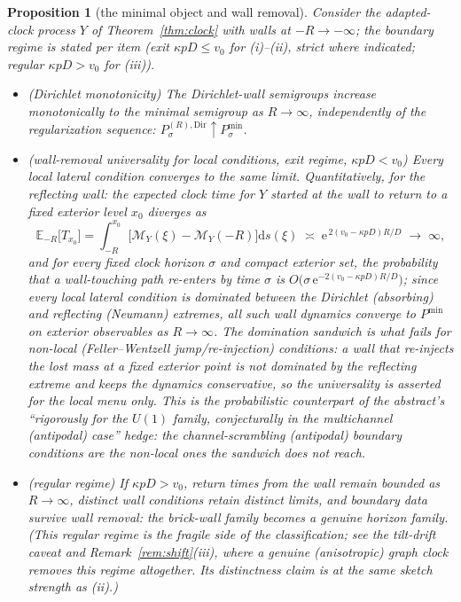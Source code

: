 \documentclass[11pt]{article}
\newtheorem{proposition}[theorem]{Proposition}
\theoremstyle{definition}
\theoremstyle{remark}
\newcommand{\ee}{\mathrm{e}}
\newcommand{\dd}{\mathrm{d}}
\begin{document}
\begin{proposition}[the minimal object and wall removal]
\label{prop:wall}
Consider the adapted-clock process $Y$ of Theorem~\ref{thm:clock} with
walls at $-R\to-\infty$; the boundary regime is stated per item (exit
$\kappa pD\le v_{0}$ for (i)--(ii), strict where indicated; regular
$\kappa pD>v_{0}$ for (iii)).
\begin{itemize}
\item[(i)] \textup{(Dirichlet monotonicity)} The Dirichlet-wall
semigroups increase monotonically to the minimal semigroup as
$R\to\infty$, independently of the regularization sequence:
$P^{(R),\mathrm{Dir}}_{\sigma}\uparrow P^{\min}_{\sigma}$.
\item[(ii)] \textup{(wall-removal universality for local conditions,
exit regime, $\kappa pD<v_{0}$)} Every \emph{local} lateral condition
converges to the same limit.
Quantitatively, for the reflecting wall: the expected clock time for
$Y$ started at the wall to return to a fixed exterior level $x_{0}$
diverges as
\begin{equation}
\mathbb{E}_{-R}\bigl[T_{x_{0}}\bigr]
=\int_{-R}^{x_{0}}\bigl[\mathcal{M}_{Y}(\xi)-\mathcal{M}_{Y}(-R)\bigr]\dd s(\xi)
\;\asymp\;\ee^{\,2(v_{0}-\kappa pD)R/D}
\;\longrightarrow\;\infty ,
\end{equation}
and for every fixed clock horizon $\sigma$ and compact exterior set,
the probability that a wall-touching path re-enters by time $\sigma$
is $O\!\bigl(\sigma\,\ee^{-2(v_{0}-\kappa pD)R/D}\bigr)$; since every
\emph{local} lateral condition is dominated between the
Dirichlet (absorbing) and reflecting (Neumann) extremes, all such
wall dynamics converge to $P^{\min}$ on exterior
observables as $R\to\infty$. The domination sandwich is what fails for
non-local (Feller--Wentzell jump/re-injection) conditions: a wall that
re-injects the lost mass at a fixed exterior point is not dominated by
the reflecting extreme and keeps the dynamics conservative, so the
universality is asserted for the local menu only. This is the
probabilistic counterpart of the abstract's ``rigorously for the
$U(1)$ family, conjecturally in the multichannel (antipodal) case''
hedge: the channel-scrambling (antipodal) boundary conditions are the
non-local ones the sandwich does not reach.
\item[(iii)] \textup{(regular regime)} If $\kappa pD>v_{0}$, return
times from the wall remain bounded as $R\to\infty$, distinct wall
conditions retain distinct limits, and boundary data survive wall
removal: the brick-wall family becomes a genuine horizon family. (This
regular regime is the fragile side of the classification; see the
tilt-drift caveat and Remark~\ref{rem:shift}(iii), where a genuine
(anisotropic) graph clock removes this regime altogether. Its distinctness claim is at
the same sketch strength as (ii).)
\end{itemize}
\end{proposition}
\end{document}

